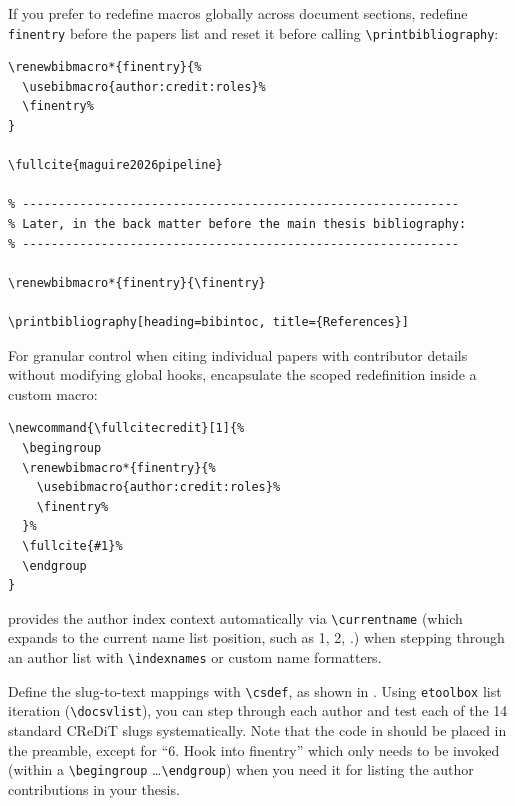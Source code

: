 \documentclass[12pt, twoside]{article}
\begin{document}
If you prefer to redefine macros globally across document sections, redefine \texttt{finentry} before the papers list and reset it before calling \texttt{\textbackslash printbibliography}:

\begin{lstlisting}[style=latexExampleForAuthors, escapechar=|, basicstyle=\footnotesize, caption={{Sequential document-level redefinition of finentry}}, label=lst:biberHookExampleSequentialRedefinition]
% In the Author Contributions front matter:
\renewbibmacro*{finentry}{%
  \usebibmacro{author:credit:roles}%
  \finentry%
}

\fullcite{maguire2026pipeline}

% -------------------------------------------------------------
% Later, in the back matter before the main thesis bibliography:
% -------------------------------------------------------------

\renewbibmacro*{finentry}{\finentry}

\printbibliography[heading=bibintoc, title={References}]
\end{lstlisting}

For granular control when citing individual papers with contributor details without modifying global hooks, encapsulate the scoped redefinition inside a custom macro:

\begin{lstlisting}[style=latexExampleForAuthors, escapechar=|, basicstyle=\footnotesize, caption={{Defining a dedicated \textbackslash fullcitecredit command}}, label=lst:biberfullcitecreditCommand]
% Dedicated command encapsulating scoped CReDiT redefinition
\newcommand{\fullcitecredit}[1]{%
  \begingroup
  \renewbibmacro*{finentry}{%
    \usebibmacro{author:credit:roles}%
    \finentry%
  }%
  \fullcite{#1}%
  \endgroup
}
\end{lstlisting}

\BibLaTeX{} provides the author index context automatically via \texttt{\textbackslash currentname} (which expands to the current name list position, such as 1, 2, \etc.) when stepping through an author list with \texttt{\textbackslash indexnames} or custom name formatters.

Define the slug-to-text mappings with \texttt{\textbackslash csdef}, as shown in . Using \texttt{etoolbox} list iteration (\texttt{\textbackslash docsvlist}), you can step through each author and test each of the 14 standard \gls{CReDiT} slugs systematically. Note that the code in  should be placed in the preamble, except for \enquote{6. Hook into finentry} which only needs to be invoked (within a \texttt{\textbackslash begingroup} \dots \texttt{\textbackslash endgroup}) when you need it for listing the author contributions in your thesis.
\end{document}
